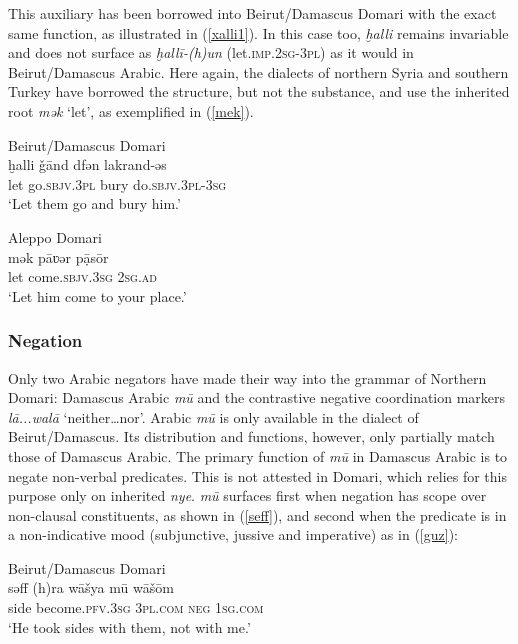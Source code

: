 \documentclass[output=paper]{langsci/langscibook}
\begin{document}
This auxiliary has been borrowed into Beirut/Damascus Domari with the exact same function, as illustrated in (\ref{xalli1}). In this case too, \textit{ḫalli} remains invariable and does not surface as \textit{ḫallī-(h)un} (let.\textsc{imp.2sg-3pl}) as it would in Beirut/Damascus Arabic. Here again, the dialects of northern Syria and southern Turkey have borrowed the structure, but not the substance, and use the inherited root \textit{mək} ‘let’, as exemplified in (\ref{mek}).

\ea\label{ex:key:} \label{xalli1}
{Beirut/Damascus Domari}\\
\gll ḫalli \v{g}ānd dfən lakrand-əs\\
     let go.\textsc{sbjv.3pl} bury do.\textsc{sbjv.3pl-3sg}\\
\glt ‘Let them go and bury him.’
\z

\ea\label{ex:key:} \label{mek}
{Aleppo Domari}\\
\gll mək pāʋər pạ̄sōr\\
     let come.\textsc{sbjv.3sg} \textsc{2sg.ad}\\
\glt ‘Let him come to your place.’
\z


 \subsubsection{Negation}

Only two Arabic negators have made their way into the grammar of Northern Domari: Damascus Arabic \textit{mū} and the contrastive negative coordination markers \textit{lā...walā} ‘neither…nor’. Arabic \textit{mū} is only available in the dialect of Beirut/Damascus. Its distribution and functions, however, only partially match those of Damascus Arabic. The primary function of \textit{mū} in Damascus Arabic is to negate non-verbal predicates. This is not attested in Domari, which relies for this purpose only on inherited \textit{nye}. \textit{mū} surfaces first when negation has scope over non-clausal constituents, as shown in (\ref{seff}), and second when the predicate is in a non-indicative mood (subjunctive, jussive and imperative) as in (\ref{guz}):

\ea
{Beirut/Damascus Domari}\\ \label{seff}
\gll səff (h)ra wāšya mū wāšōm\\
     side become\textsc{.pfv.3sg} \textsc{3pl.com} \textsc{neg} \textsc{1sg.com}\\
\glt ‘He took sides with them, not with me.’
\z
\end{document}
